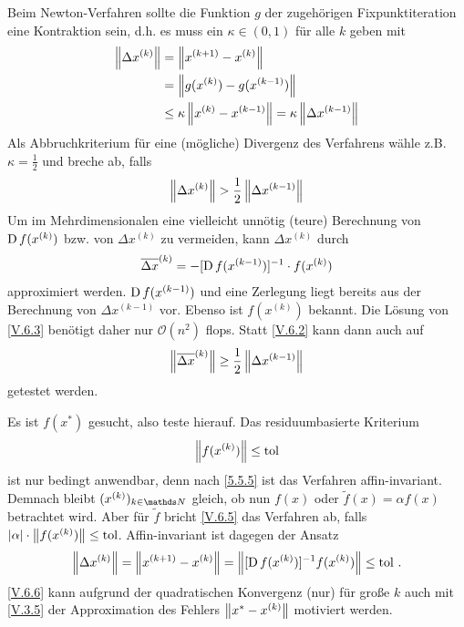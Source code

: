 Beim Newton-Verfahren sollte die Funktion $g$ der zugehörigen
Fixpunktiteration eine Kontraktion sein, d.h. es muss ein 
$\kappa \in (0,1)$ für alle $k$ geben mit
\begin{align}\nonumber
  \nn[\Delta x^{(k)}]
  &=\nn[x^{(k+1)}-x^{(k)}] \\ \nonumber
  &= \nn[g(x^{(k)})-g(x^{(k-1)})]\\
  &\leq \kappa\nn[x^{(k)}-x^{(k-1)}] = \kappa \nn[\Delta x^{(k-1)}]
    \label{V.6.1}
\end{align}
Als Abbruchkriterium für eine (mögliche) Divergenz des Verfahrens wähle z.B.
$\kappa=\frac{1}{2}$ und breche ab, falls 
\begin{gather}
  \nn[\Delta x^{(k)}]>\frac{1}{2}\nn[\Delta x^{(k-1)}]
  \label{V.6.2}
\end{gather}
Um im Mehrdimensionalen eine vielleicht unnötig (teure) Berechnung
von $\D f(x^{(k)})$ bzw. von $\Delta x^{(k)}$ zu vermeiden, 
kann $\Delta x^{(k)}$ durch 
\begin{gather}
  \overline{\Delta x}^{(k)} = -[\D f(x^{(k-1)})]^{-1}\cdot f(x^{(k)})
  \label{V.6.3}
\end{gather}
approximiert werden.
$\D f(x^{(k-1)})$ und eine Zerlegung liegt bereits 
aus der Berechnung von $\Delta x^{(k-1)}$ vor.
Ebenso ist $f(x^{(k)})$ bekannt.
Die Lösung von \eqref{V.6.3} benötigt daher nur $\mathcal{O}(n^2)$ flops.
Statt \eqref{V.6.2} kann dann auch auf 
\begin{gather}
  \nn[\overline{\Delta x}^{(k)}] \geq \frac{1}{2} \nn[\Delta x^{(k-1)}]
  \label{V.6.4}
\end{gather}
getestet werden.


Es ist $f(x^{*})$ gesucht, also teste hierauf. Das residuumbasierte Kriterium
\begin{gather}
  \nn[f(x^{(k)})]\leq \Tol
  \label{V.6.5}
\end{gather}
ist nur bedingt anwendbar, 
denn nach \ref{5.5.5} ist das Verfahren affin-invariant.
Demnach bleibt $(x^{(k)})_{k\in\N}$ gleich,
ob nun $f(x)$ oder $\widetilde{f}(x) =\alpha f(x) $ betrachtet wird.
Aber für $\widetilde{f}$ bricht \eqref{V.6.5} das Verfahren ab, 
falls $|\alpha|\cdot \nn[f(x^{(k)})] \leq \Tol$. 
Affin-invariant ist dagegen der Ansatz
\begin{gather}
  \nn[\Delta x^{(k)}]= \nn[x^{(k+1)}-x^{(k)}] 
  = \nn[{[\D f(x^{(k)})]^{-1}f(x^{(k)})}] 
  \leq \Tol \, .
  \label{V.6.6}
\end{gather}
\eqref{V.6.6} kann aufgrund der quadratischen Konvergenz (nur) für 
große $k$ auch mit \eqref{V.3.5} der Approximation des Fehlers 
$\nn[x^{*}-x^{(k)}] $ motiviert werden.


